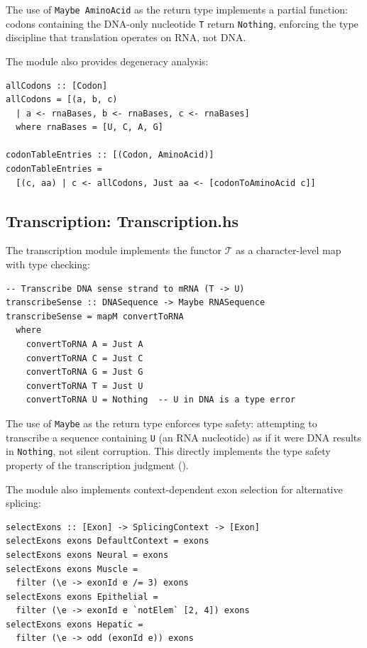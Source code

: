 \documentclass[12pt,a4paper]{article}
\theoremstyle{definition}
\begin{document}
The use of \texttt{Maybe AminoAcid} as the return type implements a partial function: codons containing the DNA-only nucleotide \texttt{T} return \texttt{Nothing}, enforcing the type discipline that translation operates on RNA, not DNA.

The module also provides degeneracy analysis:

\begin{lstlisting}[caption={Codon enumeration (CodonTable.hs)},label=lst:all-codons]
allCodons :: [Codon]
allCodons = [(a, b, c)
  | a <- rnaBases, b <- rnaBases, c <- rnaBases]
  where rnaBases = [U, C, A, G]

codonTableEntries :: [(Codon, AminoAcid)]
codonTableEntries =
  [(c, aa) | c <- allCodons, Just aa <- [codonToAminoAcid c]]
\end{lstlisting}

\subsection{Transcription: Transcription.hs}\label{sec:impl-transcription}

The transcription module implements the functor $\mathcal{T}$ as a character-level map with type checking:

\begin{lstlisting}[caption={Transcription implementation (Transcription.hs)},label=lst:transcription]
-- Transcribe DNA sense strand to mRNA (T -> U)
transcribeSense :: DNASequence -> Maybe RNASequence
transcribeSense = mapM convertToRNA
  where
    convertToRNA A = Just A
    convertToRNA C = Just C
    convertToRNA G = Just G
    convertToRNA T = Just U
    convertToRNA U = Nothing  -- U in DNA is a type error
\end{lstlisting}

The use of \texttt{Maybe} as the return type enforces type safety: attempting to transcribe a sequence containing \texttt{U} (an RNA nucleotide) as if it were DNA results in \texttt{Nothing}, not silent corruption. This directly implements the type safety property of the transcription judgment ().

The module also implements context-dependent exon selection for alternative splicing:

\begin{lstlisting}[caption={Alternative splicing (Transcription.hs)},label=lst:splicing]
selectExons :: [Exon] -> SplicingContext -> [Exon]
selectExons exons DefaultContext = exons
selectExons exons Neural = exons
selectExons exons Muscle =
  filter (\e -> exonId e /= 3) exons
selectExons exons Epithelial =
  filter (\e -> exonId e `notElem` [2, 4]) exons
selectExons exons Hepatic =
  filter (\e -> odd (exonId e)) exons
\end{lstlisting}
\end{document}
